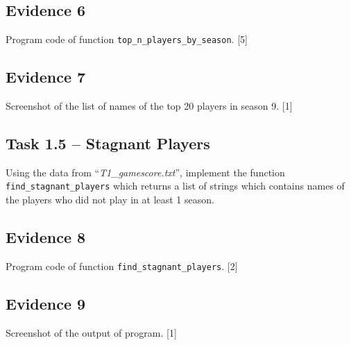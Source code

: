 \subsection*{Evidence 6 }

Program code of function \texttt{top\_n\_players\_by\_season}.\hfill{}
{[}5{]}

\subsection*{Evidence 7 }

Screenshot of the list of names of the top 20 players in season 9.\hfill{}
{[}1{]}

\subsection*{Task 1.5 -- Stagnant Players }

Using the data from \textquotedblleft \emph{T1\_gamescore.txt}\textquotedblright ,
implement the function \texttt{find\_stagnant\_players} which returns
a list of strings which contains names of the players who did not
play in at least 1 season. 

\subsection*{Evidence 8 }

Program code of function \texttt{find\_stagnant\_players}. \hfill{}{[}2{]}

\subsection*{Evidence 9 }

Screenshot of the output of program. \hfill{}{[}1{]}